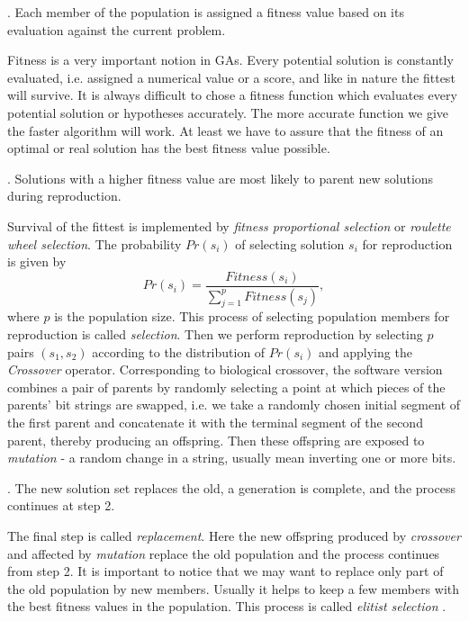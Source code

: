 \documentclass{article}
\begin{document}
\vspace{3mm}
. Each member of the population is assigned a fitness value based on
its evaluation against the current problem.
\vspace{3mm}

Fitness is a very important notion in GAs. Every potential solution is
constantly evaluated, i.e. assigned a numerical value or a score, and
like in nature the fittest will survive. It is always difficult to
chose a fitness function which evaluates every potential solution or
hypotheses accurately. The more accurate function we give the faster
algorithm will work. At least we have to assure that the fitness of an
optimal or real solution has the best fitness value possible.

\vspace{3mm}
. Solutions with a higher fitness value are most likely to parent new
solutions during reproduction.
\vspace{3mm}

Survival of the fittest is implemented by {\em fitness proportional
selection} or {\em roulette wheel selection}.  The probability
$Pr(s_i)$ of selecting solution $s_i$ for reproduction is given by
\[
	Pr(s_i) = \frac{Fitness(s_i)}{\sum_{j=1}^p Fitness(s_j)},
\]
where $p$ is the population size. This process of selecting population
members for reproduction is called {\em selection}. Then we perform
reproduction by selecting $p$ pairs $(s_1,s_2)$ according to the
distribution of $Pr(s_i)$ and applying the {\em Crossover} operator.
Corresponding to biological crossover, the software version combines a
pair of parents by randomly selecting a point at which pieces of the
parents' bit strings are swapped, i.e. we take a randomly chosen
initial segment of the first parent and concatenate it with the
terminal segment of the second parent, thereby producing an
offspring. Then these offspring are exposed to {\em mutation} - a
random change in a string, usually mean inverting one or more bits.

\vspace{3mm}
. The new solution set replaces the old, a generation is complete,
and the process continues at step 2.
\vspace{3mm}

The final step is called {\em replacement}. Here the new offspring
produced by {\em crossover} and affected by {\em mutation} replace
the old population and the process continues from step 2. It is
important to notice that we may want to replace only part of the old
population by new members. Usually it helps to keep a few members with
the best fitness values in the population. This process is called {\em
elitist selection }.
\end{document}
